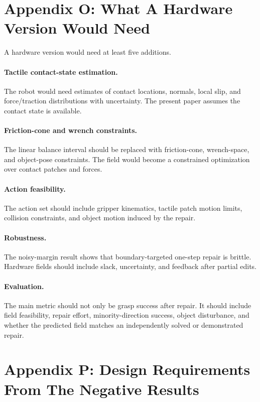 \documentclass{article}
\begin{document}
\section{Appendix O: What A Hardware Version Would Need}

A hardware version would need at least five additions.

\paragraph{Tactile contact-state estimation.}
The robot would need estimates of contact locations, normals, local slip, and force/traction distributions with uncertainty. The present paper assumes the contact state is available.

\paragraph{Friction-cone and wrench constraints.}
The linear balance interval should be replaced with friction-cone, wrench-space, and object-pose constraints. The field would become a constrained optimization over contact patches and forces.

\paragraph{Action feasibility.}
The action set should include gripper kinematics, tactile patch motion limits, collision constraints, and object motion induced by the repair.

\paragraph{Robustness.}
The noisy-margin result shows that boundary-targeted one-step repair is brittle. Hardware fields should include slack, uncertainty, and feedback after partial edits.

\paragraph{Evaluation.}
The main metric should not only be grasp success after repair. It should include field feasibility, repair effort, minority-direction success, object disturbance, and whether the predicted field matches an independently solved or demonstrated repair.

\clearpage
\section{Appendix P: Design Requirements From The Negative Results}
\end{document}
